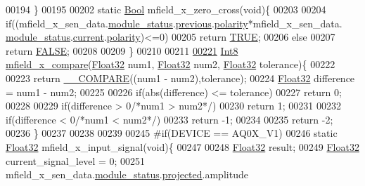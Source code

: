 \begin{DoxyCode}
00194 \}
00195 
00202 \textcolor{keyword}{static} \hyperlink{a00072_a253b248072cfc8bd812c69acd0046eed}{Bool} mfield\_x\_zero\_cross(\textcolor{keywordtype}{void})\{
00203 
00204     \textcolor{keywordflow}{if}((mfield\_x\_sen\_data.\hyperlink{a00025_adfab5a5d8b45a93dfb13edb24e2b80e3}{module\_status}.\hyperlink{a00019_adcb859b2f3983a9c58deab28e59c333f}{previous}.\hyperlink{a00019_a45152a3cd909463d7c924c30b575a073}{polarity}*mfield\_x\_sen\_data.
      \hyperlink{a00025_adfab5a5d8b45a93dfb13edb24e2b80e3}{module\_status}.\hyperlink{a00019_acf41ffc11da291c2f9f0fcb02ee72b98}{current}.\hyperlink{a00019_a45152a3cd909463d7c924c30b575a073}{polarity})<=0)
00205     \textcolor{keywordflow}{return} \hyperlink{a00040_aa8cecfc5c5c054d2875c03e77b7be15d}{TRUE};
00206     \textcolor{keywordflow}{else}
00207     \textcolor{keywordflow}{return} \hyperlink{a00040_aa93f0eb578d23995850d61f7d61c55c1}{FALSE};
00208 
00209 \}
00210 
00211 
\hypertarget{a00050_source_l00221}{}\hyperlink{a00050_adf290c10214480d55f3631c1760188b0}{00221} \hyperlink{a00072_a7e31ca7716b8d85dd473450a5c5e5a97}{Int8} \hyperlink{a00050_adf290c10214480d55f3631c1760188b0}{mfield\_x\_compare}(\hyperlink{a00072_a87d38f886e617ced2698fc55afa07637}{Float32} num1, \hyperlink{a00072_a87d38f886e617ced2698fc55afa07637}{Float32} num2, 
      \hyperlink{a00072_a87d38f886e617ced2698fc55afa07637}{Float32} tolerance)\{
00222 
00223      \textcolor{keywordflow}{return} \hyperlink{a00021_a1aaf79017d1250538fff385827b7401e}{\_\_COMPARE}((num1 - num2),tolerance);
00224    \hyperlink{a00072_a87d38f886e617ced2698fc55afa07637}{Float32} difference = num1 - num2;
00225 
00226    \textcolor{keywordflow}{if}(abs(difference) <= tolerance)
00227     \textcolor{keywordflow}{return}  0;
00228 
00229    \textcolor{keywordflow}{if}(difference > 0\textcolor{comment}{/*num1 > num2*/})
00230     \textcolor{keywordflow}{return} 1;
00231 
00232    \textcolor{keywordflow}{if}(difference < 0\textcolor{comment}{/*num1 < num2*/})
00233     \textcolor{keywordflow}{return} -1;
00234 
00235    \textcolor{keywordflow}{return} -2;
00236 \}
00237 
00238 
00239 
00245 \textcolor{preprocessor}{#if(DEVICE == AQ0X\_V1)}
00246 \textcolor{keyword}{static} \hyperlink{a00072_a87d38f886e617ced2698fc55afa07637}{Float32} mfield\_x\_input\_signal(\textcolor{keywordtype}{void})\{
00247 
00248     \hyperlink{a00072_a87d38f886e617ced2698fc55afa07637}{Float32} result;
00249     \hyperlink{a00072_a87d38f886e617ced2698fc55afa07637}{Float32} current\_signal\_level = 0;
00251               mfield\_x\_sen\_data.\hyperlink{a00025_adfab5a5d8b45a93dfb13edb24e2b80e3}{module\_status}.\hyperlink{a00019_af2267fb093fb5dcaa006a570a6da3b6b}{projected}.amplitude

\end{DoxyCode}
